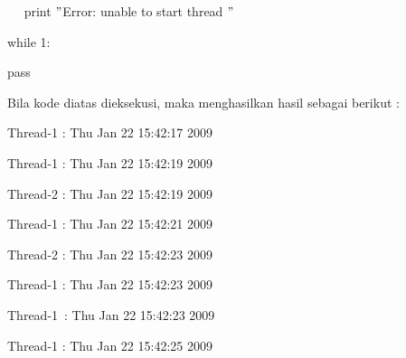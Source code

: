 \noindent 
{\fontsize{10pt}{10pt}\selectfont ~~ print  $ " $Error: unable to start thread $ " $} \par
\vspace{10pt}
\noindent 
{\fontsize{10pt}{10pt}\selectfont while 1:} \par
\noindent 
{\fontsize{10pt}{10pt}\selectfont pass} \par
{\fontsize{10pt}{10pt}\selectfont 
	
	
	
	\newpage
	
	Bila kode diatas dieksekusi, maka menghasilkan hasil sebagai berikut :} \par
\vspace{10pt}
\noindent 
\begin{center}{\fontsize{10pt}{10pt}\selectfont Thread-1 : Thu Jan 22 15:42:17 2009}\end{center} \par
\noindent 
\begin{center}{\fontsize{10pt}{10pt}\selectfont Thread-1 : Thu Jan 22 15:42:19 2009}\end{center} \par
\noindent 
\begin{center}{\fontsize{10pt}{10pt}\selectfont Thread-2 : Thu Jan 22 15:42:19 2009}\end{center} \par
\noindent 
\begin{center}{\fontsize{10pt}{10pt}\selectfont Thread-1 : Thu Jan 22 15:42:21 2009}\end{center} \par
\noindent 
\begin{center}{\fontsize{10pt}{10pt}\selectfont Thread-2 : Thu Jan 22 15:42:23 2009}\end{center} \par
\noindent 
\begin{center}{\fontsize{10pt}{10pt}\selectfont Thread-1 : Thu Jan 22 15:42:23 2009}\end{center} \par
\noindent 
\begin{center}{\fontsize{10pt}{10pt}\selectfont Thread-1~:  Thu Jan 22 15:42:23 2009}\end{center} \par
\noindent 
\begin{center}{\fontsize{10pt}{10pt}\selectfont Thread-1 : Thu Jan 22 15:42:25 2009}\end{center} \par
